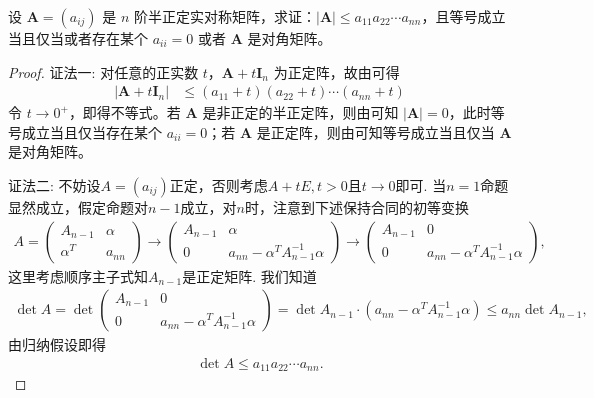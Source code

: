 \documentclass[../../main.tex]{subfiles}%
\begin{document}
\begin{proposition}\label{proposition:半正定阵行列式与主对角乘积的不等式}
设 \(\boldsymbol{A}=(a_{ij})\) 是 \(n\) 阶半正定实对称矩阵，求证：\(|\boldsymbol{A}|\leqslant  a_{11}a_{22}\cdots a_{nn}\)，且等号成立当且仅当或者存在某个 \(a_{ii}=0\) 或者 \(\boldsymbol{A}\) 是对角矩阵。 
\end{proposition}
\begin{proof}

{\color{blue}证法一:}
对任意的正实数 \(t\)，\(\boldsymbol{A}+t\boldsymbol{I}_n\) 为正定阵，故由可得
\begin{align*}
|\boldsymbol{A}+t\boldsymbol{I}_n|&\leqslant (a_{11}+t)(a_{22}+t)\cdots(a_{nn}+t)
\end{align*}
令 \(t\to0^+\)，即得不等式。若 \(\boldsymbol{A}\) 是非正定的半正定阵，则由可知 \(|\boldsymbol{A}| = 0\)，此时等号成立当且仅当存在某个 \(a_{ii}=0\)；若 \(\boldsymbol{A}\) 是正定阵，则由可知等号成立当且仅当 \(\boldsymbol{A}\) 是对角矩阵。

{\color{blue}证法二:}
不妨设$A=(a_{ij})$正定，否则考虑$A+tE,t>0$且$t \to 0$即可.
当$n=1$命题显然成立，假定命题对$n-1$成立，对$n$时，注意到下述保持合同的初等变换
\begin{align*}
A=\begin{pmatrix} A_{n-1} & \alpha \\ \alpha^T & a_{nn} \end{pmatrix} \to \begin{pmatrix} A_{n-1} & \alpha \\ 0 & a_{nn}-\alpha^T A_{n-1}^{-1}\alpha \end{pmatrix} \to \begin{pmatrix} A_{n-1} & 0 \\ 0 & a_{nn}-\alpha^T A_{n-1}^{-1}\alpha \end{pmatrix},
\end{align*}
这里考虑顺序主子式知$A_{n-1}$是正定矩阵. 我们知道
\begin{align*}
\det A = \det\begin{pmatrix} A_{n-1} & 0 \\ 0 & a_{nn}-\alpha^T A_{n-1}^{-1}\alpha \end{pmatrix} = \det A_{n-1} \cdot (a_{nn}-\alpha^T A_{n-1}^{-1}\alpha) \leqslant a_{nn} \det A_{n-1},
\end{align*}
由归纳假设即得
\begin{align*}
\det A \leqslant a_{11}a_{22}\cdots a_{nn}.
\end{align*}

\end{proof}
\end{document}
